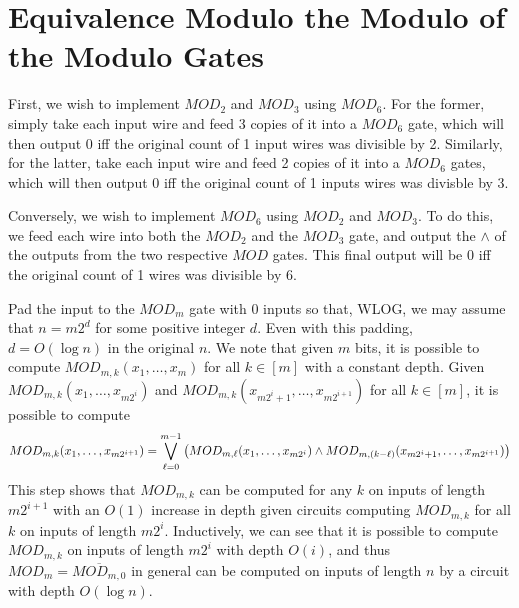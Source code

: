 \documentclass{article}
\begin{document}
\section{Equivalence Modulo the Modulo of the Modulo Gates}
\begin{alphalist}
\item First, we wish to implement $MOD_2$ and $MOD_3$ using $MOD_6$. For the former, simply take each input wire and feed 3 copies of it into a $MOD_6$ gate, which will then output 0 iff the original count of 1 input wires was divisible by 2. Similarly, for the latter, take each input wire and feed 2 copies of it into a $MOD_6$ gates, which will then output 0 iff the original count of 1 inputs wires was divisble by 3.
\item Conversely, we wish to implement $MOD_6$ using $MOD_2$ and $MOD_3$. To do this, we feed each wire into both the $MOD_2$ and the $MOD_3$ gate, and output the $\wedge$ of the outputs from the two respective $MOD$ gates. This final output will be 0 iff the original count of 1 wires was divisible by 6.
\item Pad the input to the $MOD_m$ gate with 0 inputs so that, WLOG, we may assume that $n = m2^d$ for some positive integer $d$. Even with this padding, $d = O(\log n)$ in the original $n$. We note that given $m$ bits, it is possible to compute $MOD_{m, k}(x_1, \ldots, x_m)$ for all $k \in [m]$ with a constant depth. Given $MOD_{m, k}(x_1, \ldots, x_{m2^i})$ and $MOD_{m, k}(x_{m2^i + 1}, \ldots, x_{m2^{i+1}})$ for all $k \in [m]$, it is possible to compute $$MOD_{m, k}(x_1, \ldots, x_{m2^{i+1}}) = {\bigvee_{\ell = 0}^{m-1}\qty(MOD_{m, \ell}(x_1, \ldots, x_{m2^i}) \wedge MOD_{m, (k - \ell)}(x_{m2^i + 1}, \ldots, x_{m2^{i+1}}))}$$ This step shows that $MOD_{m, k}$ can be computed for any $k$ on inputs of length $m2^{i+1}$ with an $O(1)$ increase in depth given circuits computing $MOD_{m, k}$ for all $k$ on inputs of length $m2^i$. Inductively, we can see that it is possible to compute $MOD_{m, k}$ on inputs of length $m2^i$ with depth $O(i)$, and thus $MOD_m = \overline{MOD_{m, 0}}$ in general can be computed on inputs of length $n$ by a circuit with depth $O(\log n)$.

\end{alphalist}
\end{document}
